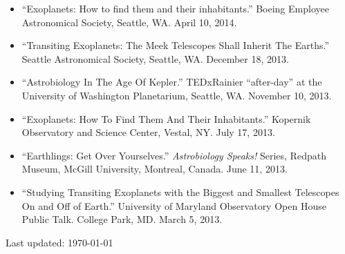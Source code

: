 \documentclass[margin]{res}
\begin{document}
\begin{resume}
\begin{itemize}
\item ``Exoplanets: How to find them and their inhabitants.'' Boeing Employee Astronomical Society, Seattle, WA. April 10, 2014.

\item ``Transiting Exoplanets: The Meek Telescopes Shall Inherit The Earths.'' Seattle Astronomical Society, Seattle, WA. December 18, 2013.

\item ``Astrobiology In The Age Of Kepler.'' TEDxRainier ``after-day'' at the University of Washington Planetarium, Seattle, WA. November 10, 2013. 

\item ``Exoplanets: How To Find Them And Their Inhabitants.'' Kopernik Observatory and Science Center, Vestal, NY. July 17, 2013. 

\item ``Earthlings: Get Over Yourselves.'' \textit{Astrobiology Speaks!} Series, Redpath Museum, McGill University, Montreal, Canada. June 11, 2013.

\item ``Studying Transiting Exoplanets with the Biggest and Smallest Telescopes On and Off of Earth.'' University of Maryland Observatory Open House Public Talk. College Park, MD. March 5, 2013.
\end{itemize}
            
\vfill \hfill {\small Last updated: \today}
\end{resume}
\end{document}
